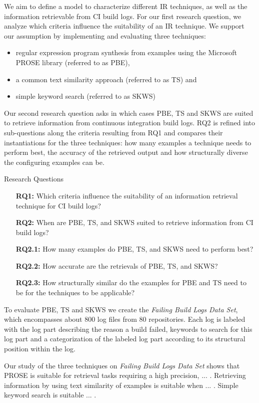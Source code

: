 \documentclass[\myrootdir/main.tex]{subfiles}
\begin{document}
We aim to define a model to characterize different IR techniques, as well as the information retrievable from CI build logs.
For our first research question, we analyze which criteria influence the suitability of an IR technique.
We support our assumption by implementing and evaluating three techniques:
\begin{itemize}
  \item regular expression program synthesis from examples using the Microsoft PROSE library (referred to as PBE),
  \item a common text similarity approach (referred to as TS) and
  \item simple keyword search (referred to as SKWS)
\end{itemize}
Our second research question asks in which cases PBE, TS and SKWS are suited to retrieve information from continuous integration build logs. RQ2 is refined into sub-questions along the criteria resulting from RQ1 and compares their instantiations for the three techniques: how many examples a technique needs to perform best, the accuracy of the retrieved output and how structurally diverse the configuring examples can be.
\begin{simplebox}{Research Questions}
\begin{itemize}
  \item[\textbf{RQ1:}] Which criteria influence the suitability of an information retrieval technique for CI build logs?
  \item[\textbf{RQ2:}] When are PBE, TS, and SKWS suited to retrieve information from CI build logs?
  \item[\textbf{RQ2.1:}] How many examples do PBE, TS, and SKWS need to perform best?
  \item[\textbf{RQ2.2:}] How accurate are the retrievals of PBE, TS, and SKWS?
  \item[\textbf{RQ2.3:}] How structurally similar do the examples for PBE and TS need to be for the techniques to be applicable?
\end{itemize}
\end{simplebox}
To evaluate PBE, TS and SKWS we create the \emph{Failing Build Logs Data Set}, which encompasses about 800 log files from 80 repositories. Each log is labeled with the log part describing the reason a build failed, keywords to search for this log part and a categorization of the labeled log part according to its structural position within the log. 



Our study of the three techniques on \emph{Failing Build Logs Data Set} shows that PROSE is suitable for retrieval tasks requiring a high precision, ... . Retrieving information by using text similarity of examples is suitable when ... . Simple keyword search is suitable ... .
\end{document}
